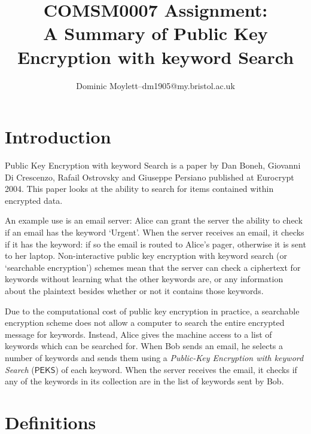 \documentclass[a4paper,11pt]{article}
\title{COMSM0007 Assignment:\\A Summary of Public Key Encryption with keyword Search}
\author{Dominic Moylett--dm1905@my.bristol.ac.uk}
\begin{document}
    \maketitle

    \section{Introduction}

    Public Key Encryption with keyword Search\cite{cryptoeprint:2003:195} is a paper by Dan Boneh, Giovanni Di Crescenzo, Rafail Ostrovsky and Giuseppe Persiano published at Eurocrypt 2004. This paper looks at the ability to search for items contained within encrypted data.

    An example use is an email server: Alice can grant the server the ability to check if an email has the keyword `Urgent'. When the server receives an email, it checks if it has the keyword: if so the email is routed to Alice's pager, otherwise it is sent to her laptop. Non-interactive public key encryption with keyword search (or `searchable encryption') schemes mean that the server can check a ciphertext for keywords without learning what the other keywords are, or any information about the plaintext besides whether or not it contains those keywords.

    Due to the computational cost of public key encryption in practice, a searchable encryption scheme does not allow a computer to search the entire encrypted message for keywords. Instead, Alice gives the machine access to a list of keywords which can be searched for. When Bob sends an email, he selects a number of keywords and sends them using a \textit{Public-Key Encryption with keyword Search} ($\mathsf{PEKS}$) of each keyword. When the server receives the email, it checks if any of the keywords in its collection are in the list of keywords sent by Bob.

    \section{Definitions}
\end{document}
